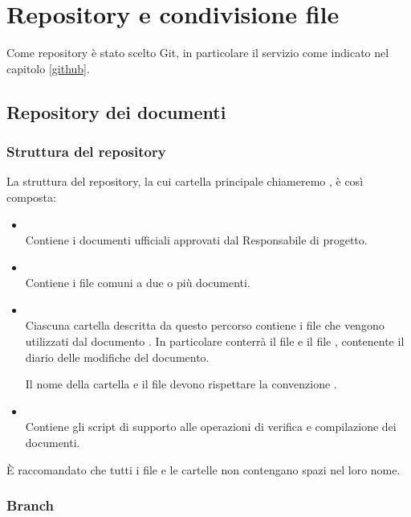 \section{Repository e condivisione file}

Come repository è stato scelto Git, in particolare il servizio  come indicato nel capitolo \ref{github}.

\subsection{Repository dei documenti}

\subsubsection{Struttura del repository}

La struttura del repository, la cui cartella principale chiameremo , è così composta:
\begin{itemize}
 \item \textbf{} \\
	Contiene i documenti ufficiali approvati dal Responsabile di progetto.

 \item \textbf{} \\
	Contiene i file comuni a due o più documenti.

 \item \textbf{} \\
	Ciascuna cartella descritta da questo percorso contiene i file che vengono utilizzati dal documento . In particolare conterrà il file  e il file , contenente il diario delle modifiche del documento.
	
	Il nome della cartella  e il file  devono rispettare la convenzione .

 \item \textbf{} \\
	Contiene gli script di supporto alle operazioni di verifica e compilazione dei documenti.
\end{itemize}

È raccomandato che tutti i file e le cartelle non contengano spazi nel loro nome.

\subsubsection{Branch}

